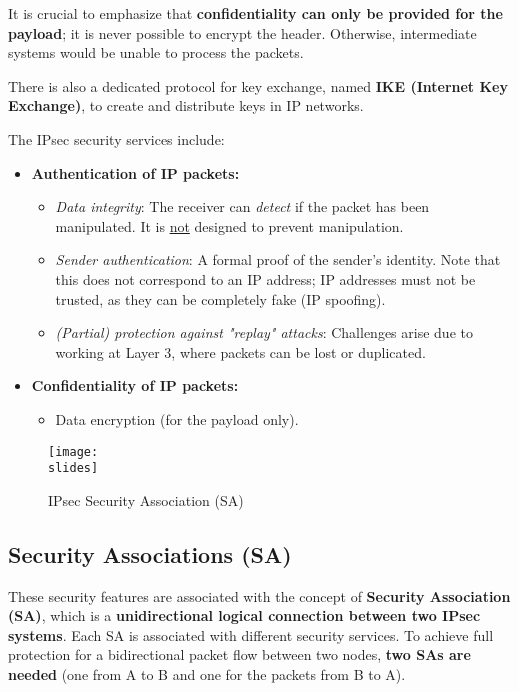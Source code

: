 It is crucial to emphasize that \textbf{confidentiality can only be provided for the payload}; it is never possible to encrypt the header. Otherwise, intermediate systems would be unable to process the packets.

There is also a dedicated protocol for key exchange, named \textbf{IKE (Internet Key Exchange)}, to create and distribute keys in IP networks.

The IPsec security services include:

\begin{itemize}
    \item \textbf{Authentication of IP packets:}
          \begin{itemize}
              \item \textit{Data integrity}: The receiver can \textit{detect} if the packet has been manipulated. It is \underline{not} designed to prevent manipulation.
              \item \textit{Sender authentication}: A formal proof of the sender's identity. Note that this does not correspond to an IP address; IP addresses must not be trusted, as they can be completely fake (IP spoofing).
              \item \textit{(Partial) protection against "replay" attacks}: Challenges arise due to working at Layer 3, where packets can be lost or duplicated.
          \end{itemize}
    \item \textbf{Confidentiality of IP packets:}
          \begin{itemize}
              \item Data encryption (for the payload only).
          \end{itemize}
\end{itemize}



\begin{figure}[h]
    \centering
    \texttt{[image: \\slides]}
    \caption{IPsec Security Association (SA)}
    \label{fig:ipsec-sa}
\end{figure}

\subsection{Security Associations (SA)}

These security features are associated with the concept of \textbf{Security Association (SA)}, which is a \textbf{unidirectional logical connection between two IPsec systems}. Each SA is associated with different security services. To achieve full protection for a bidirectional packet flow between two nodes, \textbf{two SAs are needed} (one from A to B and one for the packets from B to A).

